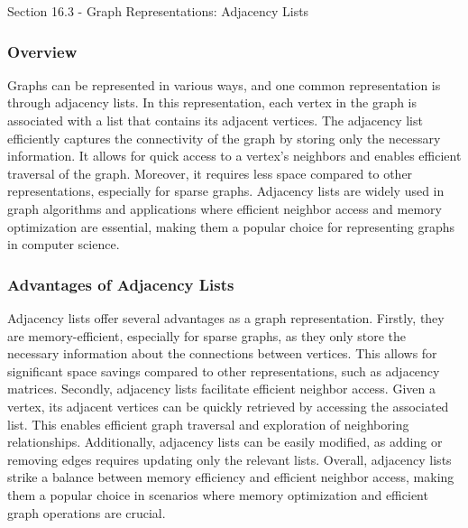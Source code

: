 \begin{notes}{Section 16.3 - Graph Representations: Adjacency Lists}
    \subsubsection*{Overview}

    Graphs can be represented in various ways, and one common representation is through adjacency lists. In this representation, each vertex in the graph is associated with a list that contains its adjacent 
    vertices. The adjacency list efficiently captures the connectivity of the graph by storing only the necessary information. It allows for quick access to a vertex's neighbors and enables efficient traversal 
    of the graph. Moreover, it requires less space compared to other representations, especially for sparse graphs. Adjacency lists are widely used in graph algorithms and applications where efficient neighbor 
    access and memory optimization are essential, making them a popular choice for representing graphs in computer science.
    
    \subsubsection*{Advantages of Adjacency Lists}
    
    Adjacency lists offer several advantages as a graph representation. Firstly, they are memory-efficient, especially for sparse graphs, as they only store the necessary information about the connections between 
    vertices. This allows for significant space savings compared to other representations, such as adjacency matrices. Secondly, adjacency lists facilitate efficient neighbor access. Given a vertex, its adjacent 
    vertices can be quickly retrieved by accessing the associated list. This enables efficient graph traversal and exploration of neighboring relationships. Additionally, adjacency lists can be easily modified, 
    as adding or removing edges requires updating only the relevant lists. Overall, adjacency lists strike a balance between memory efficiency and efficient neighbor access, making them a popular choice in scenarios 
    where memory optimization and efficient graph operations are crucial.
\end{notes}

